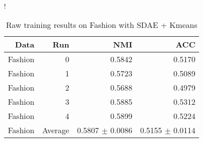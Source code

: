 \begin{table}[ht]
\caption{Raw training results on Fashion with SDAE + Kmeans}\label{tab:idec-raw-Fashion}
\resizebox{\columnwidth}!{
\begin{tabular}{ | r | r | r | r |}
\hline
Data & Run & NMI & ACC  \\ \hline 
Fashion & 0 & 0.5842 & 0.5170 \\ 
Fashion & 1 & 0.5723 & 0.5089 \\ \hdashline 
Fashion & 2 & 0.5688 & 0.4979 \\ 
Fashion & 3 & 0.5885 & 0.5312 \\ \hdashline 
Fashion & 4 & 0.5899 & 0.5224 \\ 
Fashion & Average & 0.5807 $\pm$ 0.0086 & 0.5155 $\pm$ 0.0114 \\ 
\hline
\end{tabular}
}
\end{table}